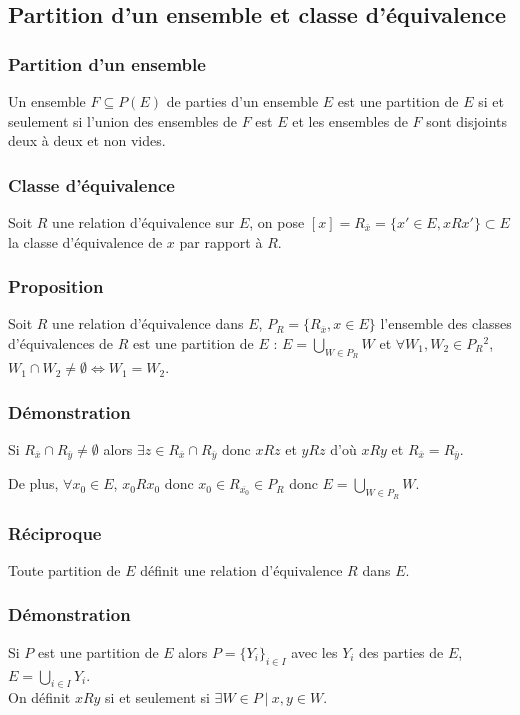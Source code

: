 \documentclass[a4paper,10pt]{book} %
\newcommand{\tq}{~|~}
\begin{document}
\newpage

\subsection{Partition d'un ensemble et classe d'équivalence}
\subsubsection{Partition d'un ensemble}
Un ensemble $F\subseteq P(E)$ de parties d'un ensemble $E$ est une partition de $E$ si et seulement si l'union des ensembles de $F$ est $E$ et les ensembles de $F$ sont disjoints deux à deux et non vides.

\subsubsection{Classe d'équivalence}
Soit $R$ une relation d’équivalence sur $E$, on pose $[x]=R_{\overline{x}}=\{x'\in E, xRx' \} \subset E$ la classe d'équivalence de $x$ par rapport à $R$.

\subsubsection{Proposition}
Soit $R$ une relation d'équivalence dans $E$, $P_R=\{R_{\overline{x}},x\in E\}$ l'ensemble des classes d'équivalences de $R$ est une partition de $E$ : 
$\displaystyle E=\bigcup_{W\in P_R}W$ et $\forall W_1,W_2\in P_R{}^2$, $W_1\cap W_2\neq \emptyset\Leftrightarrow W_1=W_2$.

\subsubsection{Démonstration}
Si $R_{\overline{x}}\cap R_{\overline{y}}\neq \emptyset$ alors $\exists z\in R_{\overline{x}}\cap R_{\overline{y}}$ donc $xRz$ et $yRz$ d'où $xRy$ et $R_{\overline{x}}=R_{\overline{y}}$.

De plus, $\forall x_0\in E$, $x_0Rx_0$ donc $x_0\in R_{\overline{x_0}}\in P_R$ donc $E=\bigcup_{W\in P_R}W$.

\subsubsection{Réciproque}
Toute partition de $E$ définit une relation d'équivalence $R$ dans $E$.

\subsubsection{Démonstration}
Si $P$ est une partition de $E$ alors $P=\{Y_i\}_{i\in I}$ avec les $Y_i$ des parties de $E$, $E=\bigcup_{i\in I}Y_i$.\\
On définit $xRy$ si et seulement si $\exists W\in P \tq x,y\in W$.\\
\end{document}
